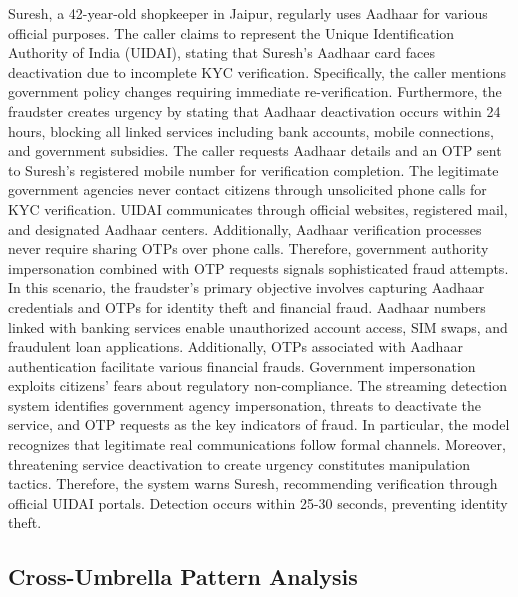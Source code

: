 \documentclass{article}
\begin{document}
Suresh, a 42-year-old shopkeeper in Jaipur, regularly uses Aadhaar for various official purposes. The caller claims to represent the Unique Identification Authority of India (UIDAI), stating that Suresh's Aadhaar card faces deactivation due to incomplete KYC verification. Specifically, the caller mentions government policy changes requiring immediate re-verification. Furthermore, the fraudster creates urgency by stating that Aadhaar deactivation occurs within 24 hours, blocking all linked services including bank accounts, mobile connections, and government subsidies. The caller requests Aadhaar details and an OTP sent to Suresh's registered mobile number for verification completion. The legitimate government agencies never contact citizens through unsolicited phone calls for KYC verification. UIDAI communicates through official websites, registered mail, and designated Aadhaar centers. Additionally, Aadhaar verification processes never require sharing OTPs over phone calls. Therefore, government authority impersonation combined with OTP requests signals sophisticated fraud attempts. In this scenario, the fraudster's primary objective involves capturing Aadhaar credentials and OTPs for identity theft and financial fraud. Aadhaar numbers linked with banking services enable unauthorized account access, SIM swaps, and fraudulent loan applications. Additionally, OTPs associated with Aadhaar authentication facilitate various financial frauds. Government impersonation exploits citizens' fears about regulatory non-compliance. The streaming detection system identifies government agency impersonation, threats to deactivate the service, and OTP requests as the key indicators of fraud. In particular, the model recognizes that legitimate real communications follow formal channels. Moreover, threatening service deactivation to create urgency constitutes manipulation tactics. Therefore, the system warns Suresh, recommending verification through official UIDAI portals. Detection occurs within 25-30 seconds, preventing identity theft.

\subsection{Cross-Umbrella Pattern Analysis}
\label{app:casestudy:patterns}
\end{document}
